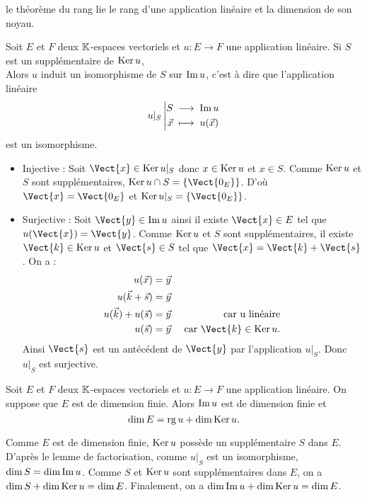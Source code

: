\documentclass{book}
\begin{document}
\begin{Texte}
 le théorème du rang lie le rang d'une application linéaire et la dimension de son noyau.
\end{Texte}
\begin{Lemme}[Factorisation]
Soit $E$ et $F$ deux $\mathbb{K} $-espaces vectoriels  et $u:E\to F$ une application linéaire.
Si $S$ est un supplémentaire de $\operatorname{Ker} u$, \\
Alors $u$ induit un isomorphisme de $S$ sur $\operatorname{Im} u$,
c'est à dire que l'application linéaire
\[ {u\vert_S}\left|\begin{aligned}{S}&\;\longrightarrow\;{\operatorname{Im} u}\\{\vec{x}}&\;\longmapsto\;{u(\vec{x})}\end{aligned}\right. \]
est un isomorphisme.
\end{Lemme}
\begin{Demonstration}
\begin{itemize}
\item Injective :  Soit $\Vect{x}\in\Ker u\vert_S$ donc $x\in\operatorname{Ker} u$ et  $x\in S$. Comme $\operatorname{Ker} u$ et  $S$ sont supplémentaires, $\Ker u \cap S =\{\Vect{0_E}\}$. D'où $\Vect{x}=\Vect{0_E}$ et $\Ker u\vert_S=\{\Vect{0_E}\}$. 
\item Surjective : Soit $\Vect{y}\in \im u$ ainsi il existe $\Vect{x}\in E$ tel que $u(\Vect{x})=\Vect{y}$.  Comme  $\operatorname{Ker} u$ et  $S$ sont supplémentaires, il existe $\Vect{k}\in\Ker u$  et $\Vect{s}\in S $ tel que $\Vect{x}=\Vect{k}+\Vect{s}$. On  a :
$$
\begin{aligned}
u(\vec{x})&=\vec{y}&\\
u(\vec{k}+\vec{s})&=\vec{y}&\\
u(\vec{k})+u(\vec{s})&=\vec{y}&\text{ car u  linéaire}\\
 u(\vec{s})&=\vec{y}&\text{ car } \Vect{k}\in\Ker u.\\
\end{aligned}
$$
Ainsi $\Vect{s}$ est un antécédent de $\Vect{y}$ par l'application $u\vert_S$. Donc $u\vert_S$ est surjective.
\end{itemize}
\end{Demonstration}

\begin{Theoreme}
Soit $E$ et $F$ deux $\mathbb{K} $-espaces vectoriels  et $u:E\to F$ une application linéaire.
On suppose que $E$ est de dimension finie.
Alors $\operatorname{Im} u$ est de dimension finie et
\[ \dim E = \operatorname{rg} u + \dim \operatorname{Ker} u. \]
\end{Theoreme}

\begin{Demonstration}
Comme $E$ est de dimension finie, $\operatorname{Ker} u$ possède un supplémentaire $S$ dans $E$. D'après le lemme de factorisation, comme $u\vert_S$ 
est un isomorphisme,   $\dim S = \dim \operatorname{Im} u$. Comme  $S$ et $\operatorname{Ker} u$ sont supplémentaires dans $E$, on a $\dim S+\dim \operatorname{Ker} u=\dim E$. Finalement, on a 
$\dim \operatorname{Im} u+\dim \operatorname{Ker} u=\dim E$.
\end{Demonstration}
\end{document}
